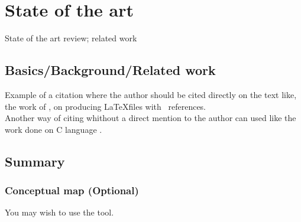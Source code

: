 \chapter{State of the art}
  State of the art review; related work

\section{Basics/Background/Related work}
Example of a citation where the author should be cited directly on the text like, the work of \cite{GRM97}, on producing \LaTeX files with \Bibtex\ references. \\
Another way of citing whithout a direct mention to the author can used like the work done on C language \citep{KeR88}.

   \section{Summary}
    \subsection{Conceptual map (Optional)}
You may wish to use the  tool.
